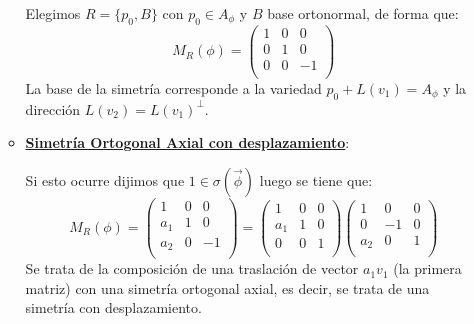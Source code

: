 \documentclass[10pt,a4paper,openright]{book}
\begin{document}
\begin{itemize}
\begin{itemize}
	Elegimos $R=\{p_0, B\}$ con $p_0\in A_\phi$ y $B$ base ortonormal, de forma que:
	$$M_R (\phi) = \left(\begin{array}{c|cc} 1 & 0  & 0  \\ \hline 0 & 1 & 0 \\0 & 0 & -1 \\ \end{array} \right)$$
	La base de la simetría corresponde a la variedad $p_0 + L(v_1) = A_\phi$ y la dirección $L(v_2) = L(v_1)^\perp$.

	\item \underline{\textbf{Simetría Ortogonal Axial con desplazamiento}}: 
	
	Si esto ocurre dijimos que $1 \in \sigma(\vec{\phi})$ luego se tiene que:
	$$M_R (\phi) = \left(\begin{array}{c|cc} 1 & 0  & 0  \\ \hline a_1 & 1 & 0 \\ a_2 & 0 & -1 \\ \end{array} \right) = \left(\begin{array}{c|cc} 1 & 0  & 0  \\ \hline a_1 & 1 & 0 \\ 0 & 0 & 1 \\ \end{array} \right)\left(\begin{array}{c|cc} 1 & 0  & 0  \\ \hline 0 & -1 & 0 \\ a_2 & 0 & 1 \\\end{array} \right)$$
	Se trata de la composición de una traslación de vector $a_1 v_1$ (la primera matriz) con una simetría ortogonal axial, es decir, se trata de una simetría con desplazamiento.
	\end{itemize}
\end{itemize}
\end{document}
